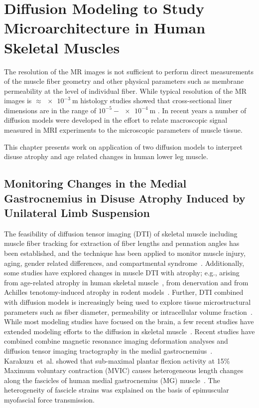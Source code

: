\chapter{Diffusion Modeling to Study Microarchitecture in Human Skeletal Muscles}
\label{ch: DiffusionExp}
The resolution of the MR images is not sufficient to perform direct measurements of the muscle fiber geometry and other physical parameters such as membrane permeability at the level of individual fiber. 
While typical resolution of the MR images is $\approx \SI{e-3}{\m}$ histology studies showed that cross-sectional liner dimensions are in the range of $10^{-5} - \SI{e-4}{\m}$ \cite{TAYLOR200335}. 
In recent years a number of diffusion models were developed in the effort to relate macroscopic signal measured in MRI experiments to the microscopic parameters of muscle tissue. 

This chapter presents work on application of two diffusion models to interpret disuse atrophy and age related changes in human lower leg muscle.

\section{Monitoring Changes in the Medial Gastrocnemius in Disuse Atrophy Induced by Unilateral Limb Suspension}
\label{sec: DTI ULLS}
The feasibility of diffusion tensor imaging (DTI) of skeletal muscle including muscle fiber tracking for extraction of fiber lengths and pennation angles has been established, and the technique has been applied to monitor muscle injury, aging, gender related differences, and compartmental syndrome~\cite{RND1, RND2, RND3, RND4, RND5, RND6}. 
Additionally, some studies have explored changes in muscle DTI with atrophy; e.g., arising from age-related atrophy in human skeletal muscle~\cite{RND7}, from denervation and from Achilles tenotomy-induced atrophy in rodent models~\cite{RND8, RND9}.
Further, DTI combined with diffusion models is increasingly being used to explore tissue microstructural parameters such as fiber diameter, permeability or intracellular volume fraction~\cite{RND10}.
While most modeling studies have focused on the brain, a few recent studies have extended modeling efforts to the diffusion in skeletal muscle~\cite{RND11, RND12, RND13}. 
Recent studies have combined combine magnetic resonance imaging deformation analyses and diffusion tensor imaging tractography in the medial gastrocnemius~\cite{RNSS4,RNCS4}. 
Karakuzu~et~al. showed that sub-maximal plantar flexion activity at 15\% Maximum voluntary contraction (MVIC) causes heterogeneous length changes along the fascicles of human medial gastrocnemius (MG) muscle~\cite{RNCS4}.
The heterogeneity of fascicle strains was explained on the basis of epimuscular myofascial force transmission. 

